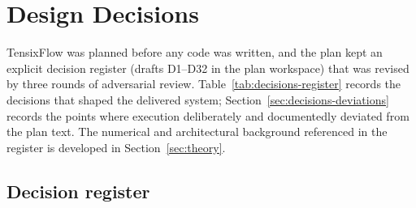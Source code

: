 \section{Design Decisions}\label{sec:decisions}

TensixFlow was planned before any code was written, and the plan kept an explicit
decision register (drafts D1--D32 in the plan workspace) that was revised by three
rounds of adversarial review. Table~\ref{tab:decisions-register} records the
decisions that shaped the delivered system; Section~\ref{sec:decisions-deviations}
records the points where execution deliberately and documentedly deviated from the
plan text. The numerical and architectural background referenced in the register is
developed in Section~\ref{sec:theory}.

\subsection{Decision register}

